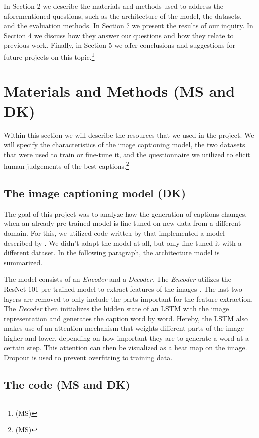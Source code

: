 \documentclass[11pt]{article}
\begin{document}
In Section 2 we describe the materials and methods used to address the aforementioned questions, such as the architecture of the model, the datasets, and the evaluation methods. In Section 3 we present the results of our inquiry. In Section 4 we discuss how they answer our questions and how they relate to previous work. Finally, in Section 5 we offer conclusions and suggestions for future projects on this topic.\footnote{(MS)}

\section{Materials and Methods (MS and DK)}

Within this section we will describe the resources that we used in the project. We will specify the characteristics of the image captioning model, the two datasets that were used to train or fine-tune it, and the questionnaire we utilized to elicit human judgements of the best captions.\footnote{(MS)}

\subsection{The image captioning model (DK)}

The goal of this project was to analyze how the generation of captions changes, when an already pre-trained model is fine-tuned on new data from a different domain. For this, we utilized code written by \cite{ilinykh} that implemented a model described by \cite{xu2015attend}. We didn't adapt the model at all, but only fine-tuned it with a different dataset. In the following paragraph, the architecture model is summarized.

The model consists of an \emph{Encoder} and a \emph{Decoder}. The \emph{Encoder} utilizes the ResNet-101 pre-trained model to extract features of the images \cite{resnet}. The last two layers are removed to only include the parts important for the feature extraction. The \emph{Decoder} then initializes the hidden state of an LSTM with the image representation and generates the caption word by word. Hereby, the LSTM also makes use of an attention mechanism that weights different parts of the image higher and lower, depending on how important they are to generate a word at a certain step. This attention can then be visualized as a heat map on the image. Dropout is used to prevent overfitting to training data.

\subsection{The code (MS and DK)}
\end{document}
